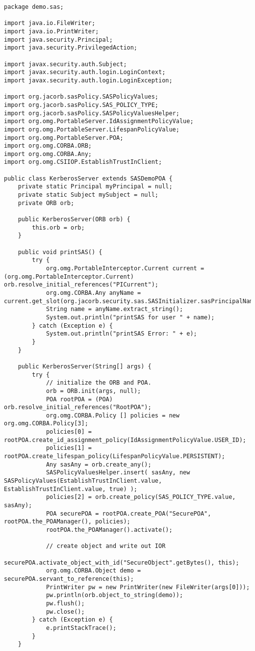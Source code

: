 \begin{scriptsize}
\begin{verbatim}
package demo.sas;

import java.io.FileWriter;
import java.io.PrintWriter;
import java.security.Principal;
import java.security.PrivilegedAction;

import javax.security.auth.Subject;
import javax.security.auth.login.LoginContext;
import javax.security.auth.login.LoginException;

import org.jacorb.sasPolicy.SASPolicyValues;
import org.jacorb.sasPolicy.SAS_POLICY_TYPE;
import org.jacorb.sasPolicy.SASPolicyValuesHelper;
import org.omg.PortableServer.IdAssignmentPolicyValue;
import org.omg.PortableServer.LifespanPolicyValue;
import org.omg.PortableServer.POA;
import org.omg.CORBA.ORB;
import org.omg.CORBA.Any;
import org.omg.CSIIOP.EstablishTrustInClient;

public class KerberosServer extends SASDemoPOA {
	private static Principal myPrincipal = null; 
	private static Subject mySubject = null;	
	private ORB orb;

	public KerberosServer(ORB orb) {
		this.orb = orb;
	}

	public void printSAS() {
		try {
			org.omg.PortableInterceptor.Current current = (org.omg.PortableInterceptor.Current) orb.resolve_initial_references("PICurrent");
			org.omg.CORBA.Any anyName = current.get_slot(org.jacorb.security.sas.SASInitializer.sasPrincipalNamePIC);
			String name = anyName.extract_string();
			System.out.println("printSAS for user " + name);
		} catch (Exception e) {
			System.out.println("printSAS Error: " + e);
		}
	}
	
	public KerberosServer(String[] args) {
		try {
			// initialize the ORB and POA.
			orb = ORB.init(args, null);
			POA rootPOA = (POA) orb.resolve_initial_references("RootPOA");
			org.omg.CORBA.Policy [] policies = new org.omg.CORBA.Policy[3];
			policies[0] = rootPOA.create_id_assignment_policy(IdAssignmentPolicyValue.USER_ID);
			policies[1] = rootPOA.create_lifespan_policy(LifespanPolicyValue.PERSISTENT);
			Any sasAny = orb.create_any();
			SASPolicyValuesHelper.insert( sasAny, new SASPolicyValues(EstablishTrustInClient.value, EstablishTrustInClient.value, true) );
			policies[2] = orb.create_policy(SAS_POLICY_TYPE.value, sasAny);
			POA securePOA = rootPOA.create_POA("SecurePOA", rootPOA.the_POAManager(), policies);
			rootPOA.the_POAManager().activate();
			
			// create object and write out IOR
			securePOA.activate_object_with_id("SecureObject".getBytes(), this);
			org.omg.CORBA.Object demo = securePOA.servant_to_reference(this);
			PrintWriter pw = new PrintWriter(new FileWriter(args[0]));
			pw.println(orb.object_to_string(demo));
			pw.flush();
			pw.close();
		} catch (Exception e) {
			e.printStackTrace();
		}
	}


\end{verbatim}
\end{scriptsize}
